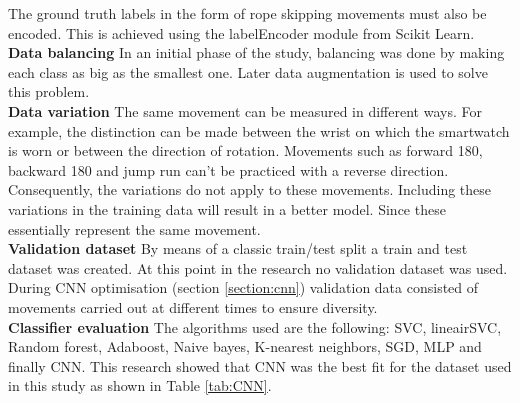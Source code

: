 \documentclass[twocolumn]{phdsymp} %
\begin{document}
The ground truth labels in the form of rope skipping movements must also be encoded. This is achieved using the labelEncoder module from Scikit Learn. \\

\noindent\textbf{Data balancing}\newline
In an initial phase of the study, balancing was done by making each class as big as the smallest one. Later data augmentation is used to solve this problem. \\

\noindent\textbf{Data variation}\newline
The same movement can be measured in different ways. For example, the distinction can be made between the wrist on which the smartwatch is worn or between the direction of rotation.
Movements such as forward 180, backward 180 and jump run can't be practiced with a reverse direction. Consequently, the variations do not apply to these movements.
Including these variations in the training data will result in a better model. Since these essentially represent the same movement.  \\

\noindent\textbf{Validation dataset}\newline
By means of a classic train/test split a train and test dataset was created. At this point in the research no validation dataset was used. During CNN optimisation (section \ref{section:cnn}) validation data consisted of movements carried out at different times to ensure diversity. \\

\noindent\textbf{Classifier evaluation}\newline
The algorithms used are the following: SVC, lineairSVC, Random forest, Adaboost, Naive bayes, K-nearest neighbors, SGD, MLP and finally CNN. This research showed that CNN was the best fit for the dataset used in this study as shown in Table \ref{tab:CNN}.  
\end{document}

